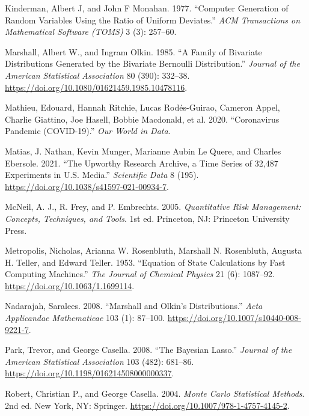 \documentclass[
  11pt,
  letterpaper,
]{scrbook}
\newlength{\cslhangindent}
\newenvironment{CSLReferences}[2] %
 {\begin{list}{}{%
  \setlength{\itemindent}{0pt}
  \setlength{\leftmargin}{0pt}
  \setlength{\parsep}{0pt}
  \ifodd #1
   \setlength{\leftmargin}{\cslhangindent}
   \setlength{\itemindent}{-1\cslhangindent}
  \fi
  \setlength{\itemsep}{#2\baselineskip}}}
 {\end{list}}
\theoremstyle{definition}
\theoremstyle{plain}
\theoremstyle{plain}
\theoremstyle{definition}
\theoremstyle{definition}
\theoremstyle{remark}
\begin{document}
\begin{CSLReferences}{1}{0}
Kinderman, Albert J, and John F Monahan. 1977. {``Computer Generation of
Random Variables Using the Ratio of Uniform Deviates.''} \emph{ACM
Transactions on Mathematical Software (TOMS)} 3 (3): 257--60.

Marshall, Albert W., and Ingram Olkin. 1985. {``A Family of Bivariate
Distributions Generated by the Bivariate {B}ernoulli Distribution.''}
\emph{Journal of the American Statistical Association} 80 (390):
332--38. \url{https://doi.org/10.1080/01621459.1985.10478116}.

Mathieu, Edouard, Hannah Ritchie, Lucas Rodés-Guirao, Cameron Appel,
Charlie Giattino, Joe Hasell, Bobbie Macdonald, et al. 2020.
{``Coronavirus Pandemic (COVID-19).''} \emph{Our World in Data}.

Matias, J. Nathan, Kevin Munger, Marianne Aubin Le Quere, and Charles
Ebersole. 2021. {``The {U}pworthy {R}esearch {A}rchive, a Time Series of
32,487 Experiments in {U.S.} Media.''} \emph{Scientific Data} 8 (195).
\url{https://doi.org/10.1038/s41597-021-00934-7}.

McNeil, A. J., R. Frey, and P. Embrechts. 2005. \emph{Quantitative Risk
Management: Concepts, Techniques, and Tools}. 1st ed. Princeton, NJ:
Princeton University Press.

Metropolis, Nicholas, Arianna W. Rosenbluth, Marshall N. Rosenbluth,
Augusta H. Teller, and Edward Teller. 1953. {``Equation of State
Calculations by Fast Computing Machines.''} \emph{The Journal of
Chemical Physics} 21 (6): 1087--92.
\url{https://doi.org/10.1063/1.1699114}.

Nadarajah, Saralees. 2008. {``{M}arshall and {O}lkin's Distributions.''}
\emph{Acta Applicandae Mathematicae} 103 (1): 87--100.
\url{https://doi.org/10.1007/s10440-008-9221-7}.

Park, Trevor, and George Casella. 2008. {``The {B}ayesian {L}asso.''}
\emph{Journal of the American Statistical Association} 103 (482):
681--86. \url{https://doi.org/10.1198/016214508000000337}.

Robert, Christian P., and George Casella. 2004. \emph{{M}onte {C}arlo
Statistical Methods}. 2nd ed. New York, NY: Springer.
\url{https://doi.org/10.1007/978-1-4757-4145-2}.


\end{CSLReferences}
\end{document}
